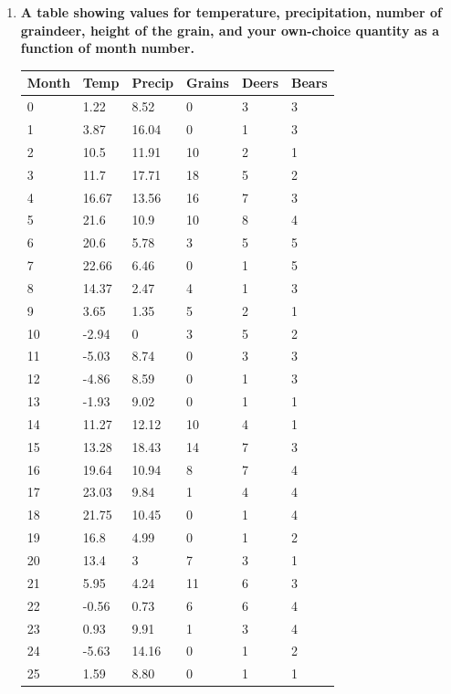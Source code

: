 \documentclass[12pt]{article} %
\begin{document}
\begin{enumerate}
		\item \textbf{A table showing values for temperature, precipitation, number of graindeer, height of the grain, and your own-choice quantity as a function of month number.}
		\begin{center}
			\begin{tabular}{ | l | l | l | l | l | l | } \hline
				Month & Temp & Precip & Grains & Deers & Bears \\ \hline
				0 & 1.22 & 8.52 & 0 & 3 & 3 \\ \hline
				1 & 3.87 & 16.04 & 0 & 1 & 3 \\ \hline
				2 & 10.5 & 11.91 & 10 & 2 & 1 \\ \hline
				3 & 11.7 & 17.71 & 18 & 5 & 2 \\ \hline
				4 & 16.67 & 13.56 & 16 & 7 & 3 \\ \hline
				5 & 21.6 & 10.9 & 10 & 8 & 4 \\ \hline
				6 & 20.6 & 5.78 & 3 & 5 & 5 \\ \hline
				7 & 22.66 & 6.46 & 0 & 1 & 5 \\ \hline
				8 & 14.37 & 2.47 & 4 & 1 & 3 \\ \hline
				9 & 3.65 & 1.35 & 5 & 2 & 1 \\ \hline
				10 & -2.94 & 0 & 3 & 5 & 2 \\ \hline
				11 & -5.03 & 8.74 & 0 & 3 & 3 \\ \hline
				12 & -4.86 & 8.59 & 0 & 1 & 3 \\ \hline
				13 & -1.93 & 9.02 & 0 & 1 & 1 \\ \hline
				14 & 11.27 & 12.12 & 10 & 4 & 1 \\ \hline
				15 & 13.28 & 18.43 & 14 & 7 & 3 \\ \hline
				16 & 19.64 & 10.94 & 8 & 7 & 4 \\ \hline
				17 & 23.03 & 9.84 & 1 & 4 & 4 \\ \hline
				18 & 21.75 & 10.45 & 0 & 1 & 4 \\ \hline
				19 & 16.8 & 4.99 & 0 & 1 & 2 \\ \hline
				20 & 13.4 & 3 & 7 & 3 & 1 \\ \hline
				21 & 5.95 & 4.24 & 11 & 6 & 3 \\ \hline
				22 & -0.56 & 0.73 & 6 & 6 & 4 \\ \hline
				23 & 0.93 & 9.91 & 1 & 3 & 4 \\ \hline
				24 & -5.63 & 14.16 & 0 & 1 & 2 \\ \hline
				25 & 1.59 & 8.80 & 0 & 1 & 1 \\ \hline

\end{tabular}
\end{center}
\end{enumerate}
\end{document}
